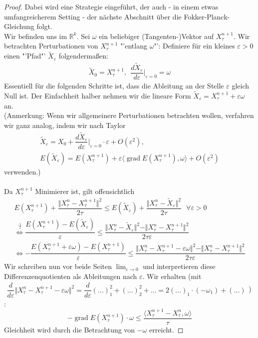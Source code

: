 \documentclass[11pt,a4paper,notitlepage]{scrreprt}
\newcommand{\RR}{\mathbb{R}}
\newcommand{\grad}{\operatorname{grad}}
\begin{document}
\begin{proof}
Dabei wird eine Strategie eingeführt, der auch - in einem etwas umfangreicherem Setting - der nächste Abschnitt über die Fokker-Planck-Gleichung folgt. \\
Wir befinden uns im $\RR^k$. Sei $\omega$ ein beliebiger (Tangenten-)Vektor auf $X_\tau^{n+1}$. Wir betrachten Perturbationen von $X_\tau^{n+1}$ "'entlang $\omega$"': Definiere für ein kleines $\varepsilon>0$ einen "'Pfad"' $\tilde{X}_\varepsilon$ folgendermaßen: \\
\begin{eqnarray}
\tilde{X}_0=X_\tau^{n+1},~~\dfrac{d\tilde{X}_\varepsilon}{d\varepsilon}\Bigg|_{\varepsilon=0} =\omega
\end{eqnarray}
Essentiell für die folgenden Schritte ist, dass die Ableitung an der Stelle $\varepsilon$ gleich Null ist. Der Einfachheit halber nehmen wir die lineare Form $\tilde{X}_\varepsilon=X_\tau^{n+1}+\varepsilon\omega$ an.\\
(Anmerkung: Wenn wir allgemeinere Perturbationen betrachten wollen, verfahren wir ganz analog, indem wir nach Taylor \begin{align}
\tilde{X}_\varepsilon = X_0+\dfrac{d\tilde{X}_\varepsilon}{d\varepsilon}\Bigg|_{\varepsilon=0}\cdot\varepsilon+O(\varepsilon^2),\\
E(\tilde{X}_\varepsilon)=E(X_\tau^{n+1})+\varepsilon\langle \grad E(X_\tau^{n+1}),\omega\rangle+O(\varepsilon^2) \label{b)}
\end{align}
verwenden.)\\\\



Da $X_\tau^{n+1}$ Minimierer ist, gilt offensichtlich
\begin{eqnarray}
E(X_\tau^{n+1})+\dfrac{\Vert X_\tau^n-X_\tau^{n+1}\Vert^2}{2\tau}\leq E(\tilde{X}_\varepsilon)+\dfrac{\Vert X_\tau^n-\tilde{X}_\varepsilon\Vert^2}{2\tau}~~~\forall \varepsilon>0 \label{a)}\\
\overset{\cdot\frac{1}{\varepsilon}}\Leftrightarrow \dfrac{E(X_\tau^{n+1})-E(\tilde{X}_\varepsilon)}{\varepsilon}\leq \dfrac{\Vert X_\tau^n-\tilde{X}_\varepsilon\Vert^2-\Vert X_\tau^n-X_\tau^{n+1}\Vert^2}{2\tau\varepsilon}\\
\Leftrightarrow -\dfrac{E(X_\tau^{n+1}+\varepsilon\omega)-E(X_\tau^{n+1})}{\varepsilon}\leq \dfrac{\Vert X_\tau^n-X_\tau^{n+1}-\varepsilon\omega\Vert^2-\Vert X_\tau^n-X_\tau^{n+1}\Vert^2}{2\tau\varepsilon}
\end{eqnarray}
Wir schreiben nun vor beide Seiten $\lim_{\varepsilon\to 0}$ und interpretieren diese Differenzenquotienten als Ableitungen nach $\varepsilon$. Wir erhalten (mit $\begin{aligned}\dfrac{d}{d\varepsilon}\Vert X_\tau^n-X_\tau^{n+1}-\varepsilon\omega\Vert^2=\dfrac{d}{d\varepsilon}(...)_1^2+(...)_2^2+...=2(...)_1\cdot(-\omega_1)+(...)\end{aligned}$) :
\begin{equation}
-\grad E(X_\tau^{n+1})\cdot\omega\leq \dfrac{\langle X_\tau^{n+1}-X_\tau^n,\omega\rangle}{\tau}
\end{equation}
Gleichheit wird durch die Betrachtung von $-\omega$ erreicht.
\end{proof}
\end{document}
